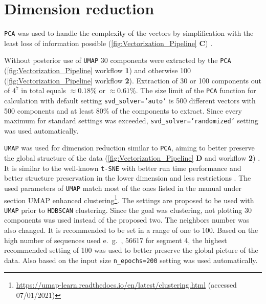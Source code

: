 \section{Dimension reduction} \label{sec:PCA}

\texttt{PCA} was used to handle the complexity of the vectors by simplification with the least loss of information possible (\autoref{fig:Vectorization_Pipeline} \textsf{\textbf{C}}) \autocite{pearson_liii_1901} \autocite{pedregosa_scikit-learn_2011}.

\vspace{1em}

Without posterior use of \texttt{UMAP} 30 components were extracted by the \texttt{PCA} (\autoref{fig:Vectorization_Pipeline} workflow \textsf{\textbf{1}}) and otherwise 100 (\autoref{fig:Vectorization_Pipeline} workflow \textsf{\textbf{2}}). Extraction of 30 or 100 components out of $4^7$ in total equals $\approx 0.18\%$ or $\approx 0.61\%$. The size limit of the \texttt{PCA} function for calculation with default setting \texttt{svd\_solver='auto'} is 500 different vectors with 500 components and at least 80\% of the components to extract. Since every maximum for standard settings was exceeded, \texttt{svd\_solver='randomized'} setting was used automatically. %

\vspace{1em}

\texttt{UMAP} was used for dimension reduction similar to \texttt{PCA}, aiming to better preserve the global structure of the data (\autoref{fig:Vectorization_Pipeline} \textsf{\textbf{D}} and workflow \textsf{\textbf{2}}) \autocite{mcinnes_umap_2020}. It is similar to the well-known \texttt{t-SNE} with better run time performance and better structure preservation in the lower dimension and less restrictions \autocite{maaten_visualizing_2008, mcinnes_umap_2020}. %
The used parameters of \texttt{UMAP} match most of the ones listed in the manual under section \glqq UMAP enhanced clustering\grqq{}\footnote{\url{https://umap-learn.readthedocs.io/en/latest/clustering.html} (accessed 07/01/2021)}. The settings are proposed to be used with \texttt{UMAP} prior to \texttt{HDBSCAN} clustering. Since the goal was clustering, not plotting 30 components was used instead of the proposed two. The neighbors number was also changed. It is recommended to be set in a range of one to 100. Based on the high number of sequences used e.~g.~, 56617 for segment 4, the highest recommended setting of 100 was used to better preserve the global picture of the data. Also based on the input size \texttt{n\_epochs=200} setting was used automatically.

